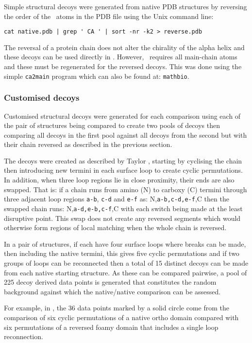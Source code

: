 Simple structural decoys were generated from native PDB structures by reversing the order
of the \CA\ atoms in the PDB file using the Unix command line:
\begin{verbatim}
cat native.pdb | grep ' CA ' | sort -nr -k2 > reverse.pdb
\end{verbatim}
The reversal of a protein chain does not alter the chirality of the alpha helix and
these decoys can be used directly in \SAP.   However, \DALI\ requires all main-chain atoms
and these must be regenerated for the reversed decoys.   This was done using the simple
{\tt ca2main} program which can also be found at: {\tt  mathbio}.

\subsubsection{Customised decoys}

Customised structural decoys were generated for each comparison using each of the
pair of structures being compared to create two pools of decoys then comparing all
decoys in the first pool against all decoys from the second but with their chain
reversed as described in the previous section.

The decoys were created as described by Taylor \cite{TaylorWR06a}, starting by cyclising the
chain then introducing new termini in each surface loop to create cyclic permutations.
In addition, when three loop regions lie in close proximity, their ends are also 
swapped.   That is: if a chain runs from amino (N) to carboxy (C) termini through
three adjacent loop regions {\tt a-b}, {\tt c-d} and {\tt e-f} as: N,{\tt a-b,c-d,e-f},C
then the swapped chain runs: N,{\tt a-d,e-b,c-f},C with each switch being made at the
least disruptive point.   This swap does not create any reversed segments which would
otherwise form regions of local matching when the whole chain is reversed.

In a pair of structures, if each have four surface loops where breaks can be made, then
including the native termini, this gives five cyclic permutations and if two groups of 
loops can be reconnected then a total of 15 distinct decoys can be made from each native
starting structure.   As these can be compared pairwise, a pool of 225 decoy derived
data points is generated that constitutes the random background against which the native/native
comparison can be assessed.

For example, in , the 36 data
points marked by a solid circle come from the comparison of six cyclic permutations of a 
native ortho domain compared with six permutations of a reversed foamy domain that includes
a single loop reconnection.  

